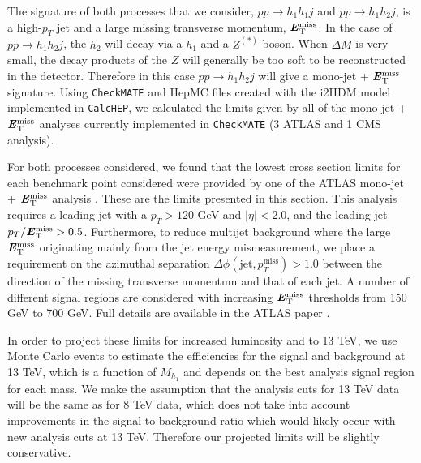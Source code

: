 \documentclass[12pt,a4paper]{article}
\newcommand{\MET}{\textbf{\textit{E}$_{\rm T}^{\rm miss}$}}
\providecommand{\DIFaddtex}[1]{{\protect\color{blue}\uwave{#1}}} %
\providecommand{\DIFaddbegin}{} %
\providecommand{\DIFdelbegin}{} %
\providecommand{\DIFdelend}{} %
\providecommand{\DIFadd}[1]{\texorpdfstring{\DIFaddtex{#1}}{#1}} %
\begin{document}
The signature of both processes that we consider, $pp\rightarrow h_1h_1j$  and $pp\rightarrow h_1h_2j$,
is a high-$p_T$ jet and a large missing transverse momentum, $\MET{}$. 
In the case of $pp\rightarrow h_1h_2j$, the $h_2$ will decay via a $h_1$ and a $Z^{(*)}$-boson. When $\Delta M$ is very small, the decay
products of the $Z$ will generally be too soft to be reconstructed in the detector. Therefore in this case $pp\rightarrow h_1h_2j$ will give a mono-jet + $\MET{}$
signature. Using {\tt CheckMATE} and HepMC files created with the i2HDM model implemented in {\tt CalcHEP}, we calculated the limits given by all of the mono-jet +
$\MET{}$ analyses currently implemented in {\tt CheckMATE} \cite{ATLAS:2012zim,Aad:2014nra,Aad:2015zva,Khachatryan:2014rra} (3 ATLAS and 1 CMS analysis).

For both processes considered, we found that the lowest cross section limits for each benchmark point considered were provided by one of the ATLAS mono-jet +
$\MET{}$ analysis \cite{Aad:2015zva}. These are the limits presented in this section. This analysis requires a leading jet with a $p_T > 120$ GeV and $|\eta|
<2.0$, and the leading jet $p_T/\MET > 0.5$. Furthermore, to reduce multijet background where the large $\MET{}$ originating mainly from the jet energy
mismeasurement, we place a requirement on the azimuthal separation $\Delta \phi (\text{jet},p_T^{\text{miss}}) > 1.0$ between the direction of the missing transverse momentum
and that of each jet. A number of different signal regions are considered with increasing $\MET{}$ thresholds from 150 GeV to 700 GeV. Full details are available in
the ATLAS paper \cite{Aad:2015zva}.

In order to project these limits for increased luminosity and to 13 TeV, we use Monte Carlo events to estimate the efficiencies for the signal and background at 13 TeV, which
is a function of $M_{h_1}$ and depends on the best analysis signal region for each mass. We make the assumption that the analysis cuts for 13 TeV data will be the same as for
8 TeV data, which does not take into account improvements in the signal to background ratio which would likely occur with new analysis cuts at 13 TeV. Therefore our projected
limits will be slightly conservative.

\DIFdelbegin %
\DIFdelend \DIFaddbegin \subsubsection{\DIFadd{Limits from $pp\rightarrow h_1h_1 j$}}
\end{document}
